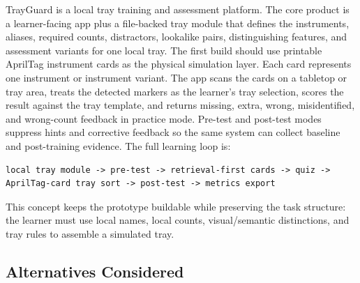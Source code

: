 \documentclass[10pt,a4paper]{article}
\begin{document}
TrayGuard is a local tray training and assessment platform. The core product is
a learner-facing app plus a file-backed tray module that defines the
instruments, aliases, required counts, distractors, lookalike pairs,
distinguishing features, and assessment variants for one local tray.
The first build should use printable AprilTag instrument cards as the physical
simulation layer. Each card represents one instrument or instrument variant.
The app scans the cards on a tabletop or tray area, treats the detected markers
as the learner's tray selection, scores the result against the tray template,
and returns missing, extra, wrong, misidentified, and wrong-count feedback in
practice mode. Pre-test and post-test modes suppress hints and corrective
feedback so the same system can collect baseline and post-training evidence.
The full learning loop is:
\begin{lstlisting}
local tray module -> pre-test -> retrieval-first cards -> quiz -> AprilTag-card tray sort -> post-test -> metrics export
\end{lstlisting}
This concept keeps the prototype buildable while preserving the task
structure: the learner must use local names, local counts, visual/semantic
distinctions, and tray rules to assemble a simulated tray.

\subsection{Alternatives Considered}
\end{document}
